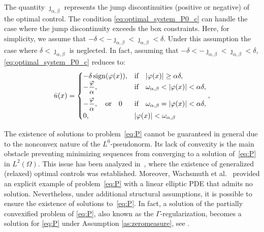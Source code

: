 \documentclass[11pt,a4paper]{amsart}
\newcommand{\om}{\Omega}
\newcommand{\sign}{\mathrm{sign}}
\begin{document}
The quantity $\jmath_{\alpha,\beta}$ represents the jump discontinuities (positive or negative) of the optimal control. The condition \eqref{eq:optimal_system_P0_c} can handle the case where the jump discontinuity exceeds the box constraints. Here, for simplicity, we assume that  $-\delta<-\jmath_{\alpha,\beta}<\jmath_{\alpha,\beta}<\delta$. Under this assumption the case where $\delta< \jmath_{\alpha,\beta}$ is neglected. In fact, assuming that $-\delta<-\jmath_{\alpha,\beta}<\jmath_{\alpha,\beta}<\delta$, \eqref{eq:optimal_system_P0_c} reduces to:
\begin{equation}
\bar u(x) = 
\begin{cases} 
-\delta \,\sign(\varphi(x)), &\text{if}\quad  |\varphi(x)| \ge \alpha\delta,\\
-\dfrac{\varphi}{\alpha},&\text{if}\quad\omega_{\alpha,\beta}< |\varphi(x)|<\alpha\delta, \vspace{2mm}\\
-\dfrac{\varphi}{\alpha}, \quad\text{or}\quad 0&\text{if}\quad\omega_{\alpha,\beta}= |\varphi(x)|<\alpha\delta, \\
0, &|\varphi(x)|<\omega_{\alpha,\beta}
\end{cases}
, \label{eq:optimal_system_P0_c}
\end{equation}



The existence of solutions to problem~\eqref{eq:P} cannot be guaranteed in general due to the nonconvex nature of the $L^0$-pseudonorm. Its lack of convexity is the main obstacle preventing minimizing sequences from converging to a solution of~\eqref{eq:P} in $L^2(\Omega)$. This issue has been analyzed in~\cite{itokun2014}, where the existence of generalized (relaxed) optimal controls was established. Moreover, Wachsmuth et al.~\cite{wachsmuth19} provided an explicit example of problem~\eqref{eq:P} with a linear elliptic PDE that admits no solution. Nevertheless, under additional structural assumptions, it is possible to ensure the existence of solutions to~\eqref{eq:P}. In fact, a solution of the partially convexified problem of \eqref{eq:P}, also known as the $\Gamma$-regularization, becomes a solution for \eqref{eq:P} under Assumption \ref{as:zeromeasure}, see \cite[Corollary Corollary 4.3]{caswach20}.
\end{document}
